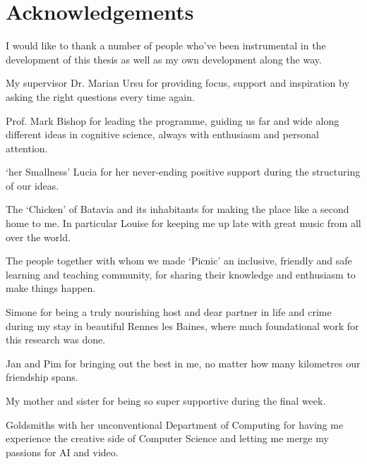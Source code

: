 \chapter{Acknowledgements} 
\label{ch:acknowledgements}

I would like to thank a number of people who've been instrumental in the development of this thesis as well as my own development along the way.

My supervisor Dr. Marian Ursu for providing focus, support and inspiration by asking the right questions every time again.

Prof. Mark Bishop for leading the programme, guiding us far and wide along different ideas in cognitive science, always with enthusiasm and personal attention.

`her Smallness' Lucia for her never-ending positive support during the structuring of our ideas.

The `Chicken' of Batavia and its inhabitants for making the place like a second home to me. In particular Louise for keeping me up late with great music from all over the world.

The people together with whom we made `Picnic' an inclusive, friendly and safe learning and teaching community, for sharing their knowledge and enthusiasm to make things happen.

Simone for being a truly nourishing host and dear partner in life and crime during my stay in beautiful Rennes les Baines, where much foundational work for this research was done.

Jan and Pim for bringing out the best in me, no matter how many kilometres our friendship spans.

My mother and sister for being so super supportive during the final week.

Goldsmiths with her unconventional Department of Computing for having me experience the creative side of Computer Science and letting me merge my passions for AI and video.